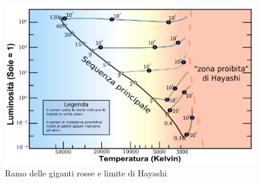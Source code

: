 \documentclass[a4paper,11pt]{article}
\begin{document}
\begin{figure}[h!!]
        \centering
        \includegraphics[width=11cm]{Rampo delle giganti rosse e limite di Hayashi.png}
        \caption{Ramo delle giganti rosse e limite di Hayashi}
        \label{fig:Rampo delle giganti rosse e limite di Hayashi.png}
    \end{figure}
\end{document}
